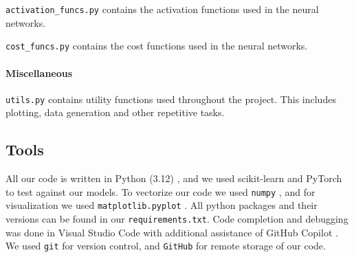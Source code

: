 \verb|activation_funcs.py| contains the activation functions used in the neural networks.

\verb|cost_funcs.py| contains the cost functions used in the neural networks.

\paragraph*{Miscellaneous}
\verb|utils.py| contains utility functions used throughout the project. This includes plotting, data generation and other repetitive tasks.

\subsection{Tools}\label{subsec:tools}

All our code is written in Python (3.12) \cite{Python},  and we used scikit-learn \cite{scikit-learn} and PyTorch\cite{PyTorch} to test against our models. To vectorize our code we used \verb|numpy| \cite{Numpy}, and for visualization we used \verb|matplotlib.pyplot| \cite{Matplotlib}. All python packages and their versions can be found in our \verb|requirements.txt|. Code completion and debugging was done in Visual Studio Code \cite{VSCode} with additional assistance of GitHub Copilot \cite{Copilot}. We used \verb|git| \cite{Git} for version control, and \verb|GitHub| \cite{GitHub} for remote storage of our code.
